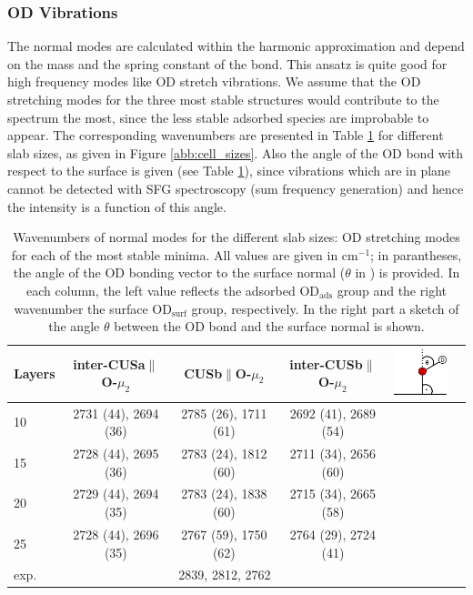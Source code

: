 \documentclass[11pt,DIV=13,BCOR=5mm,a4paper,headinclude]{scrbook}
\begin{document}
\subsubsection{OD Vibrations}
The normal modes are calculated within the harmonic approximation and depend on the mass and the spring constant of the bond.
This ansatz is quite good for high frequency modes like OD stretch vibrations.
We assume that the OD stretching modes for the three most stable structures would contribute to the spectrum the most, since the less stable adsorbed species are improbable to appear.
The corresponding wavenumbers are presented in Table \ref{tab:freq_layers} for different slab sizes, as given in Figure \ref{abb:cell_sizes}.
Also the angle of the OD bond with respect to the surface is given (see Table \ref{tab:freq_layers}), since vibrations which are in plane cannot be detected with SFG spectroscopy (sum frequency generation) and hence the intensity is a function of this angle.
\begin{table}[th]
  \centering
 \caption{Wavenumbers of normal modes for the different slab sizes: OD stretching modes for each of the most stable minima.
All values are given in cm$^{-1}$; in parantheses, the angle of the OD bonding vector to the surface normal ($\theta$ in \textdegree) is provided.
In each column, the left value reflects the adsorbed OD$_\textrm{ads}$ group and the right wavenumber the surface OD$_\textrm{surf}$ group, respectively.
 In the right part a sketch of the angle $\theta$ between the OD bond and the surface normal is shown.}
\vspace*{.2cm} 
 \begin{tabular}{l|ccccc}
 \toprule
  Layers&inter-CUSa$\parallel$O-$\mu_2$ &CUSb$\parallel$O-$\mu_2$  &inter-CUSb$\parallel$O-$\mu_2$&\multirow{6}{1pt}{\includegraphics[width=2cm]{figures/11-20/ODangle.png}} \\\midrule
  10 &2731 (44), 2694 (36) &2785 (26), 1711 (61) &2692 (41), 2689 (54)& \\
  15 &2728 (44), 2695 (36) &2783 (24), 1812 (60) &2711 (34), 2656 (60)& \\
  20 &2729 (44), 2694 (35) &2783 (24), 1838 (60) &2715 (34), 2665 (58)& \\
  25 &2728 (44), 2696 (35) &2767 (59), 1750 (62) &2764 (29), 2724 (41)& \\\midrule
  exp. & \multicolumn{3}{c}{2839, 2812, 2762}& \\\bottomrule
  \end{tabular} 
  \label{tab:freq_layers}
\end{table}
\end{document}
